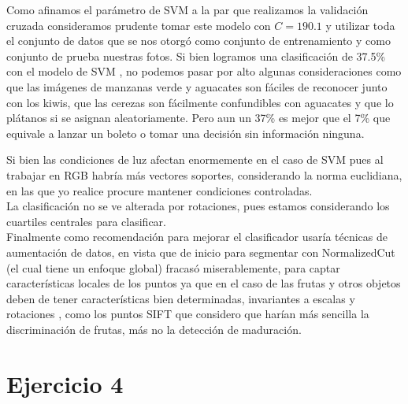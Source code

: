 \documentclass[paper=letter, fontsize=11pt]{scrartcl}
\numberwithin{equation}{section} %
\numberwithin{figure}{section} %
\numberwithin{table}{section} %
\begin{document}
Como afinamos el parámetro de SVM a la par que realizamos la validación cruzada consideramos prudente tomar este modelo con $C=190.1$ y utilizar toda el conjunto de datos que se nos otorgó como conjunto de entrenamiento y como conjunto de prueba nuestras fotos. Si bien logramos una clasificación de 37.5\% con el modelo de SVM , no podemos pasar por alto algunas consideraciones como que las imágenes de manzanas verde y aguacates son fáciles de reconocer junto con los kiwis, que las cerezas son fácilmente confundibles con aguacates y que lo plátanos si se asignan aleatoriamente. Pero aun un 37\% es mejor que el 7\% que equivale a lanzar un boleto o tomar una decisión sin información ninguna.

Si bien las condiciones de luz afectan enormemente en el caso de SVM pues al trabajar en RGB habría más vectores soportes, considerando la norma euclidiana, en las que yo realice procure mantener condiciones controladas.\\
La clasificación no se ve alterada por rotaciones, pues estamos considerando los cuartiles centrales para clasificar. \\

Finalmente como recomendación para mejorar el clasificador usaría técnicas de aumentación de datos, en vista que de inicio para segmentar con NormalizedCut (el cual tiene un enfoque global) fracasó miserablemente, para captar características locales de los puntos ya que en el caso de las frutas y otros objetos deben de tener características bien determinadas, invariantes a escalas y rotaciones , como los puntos SIFT que considero que harían más sencilla la discriminación de frutas, más no la detección de maduración.\\

\section{Ejercicio 4}
\end{document}
